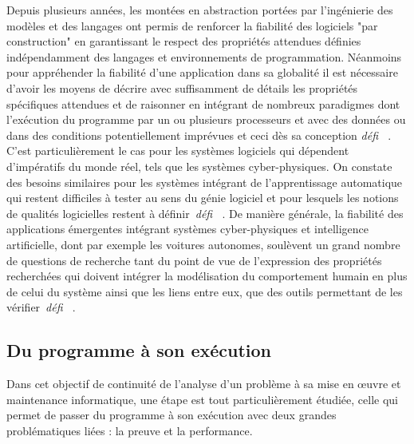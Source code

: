 \documentclass[11pt]{article}
\newcommand{\defi}[1]{\emph{défi~%
\cite{#1}}}
\begin{document}
Depuis plusieurs années, les montées en abstraction portées par l'ingénierie des modèles et des langages ont permis de renforcer la fiabilité des logiciels "par construction" en garantissant le respect des propriétés attendues définies indépendamment des langages et environnements de programmation. 
Néanmoins pour appréhender la fiabilité d'une application dans sa globalité il est nécessaire d'avoir les moyens de décrire avec suffisamment de détails les propriétés spécifiques attendues et de raisonner en intégrant de nombreux paradigmes dont l’exécution du programme par un ou plusieurs processeurs et avec des données ou dans des conditions potentiellement imprévues et ceci dès sa conception \defi{reconfiguration, compilation}. 
%
C'est particulièrement le cas pour les systèmes logiciels qui dépendent d'impératifs du monde réel, tels que les systèmes cyber-physiques. 
On constate des besoins similaires pour les systèmes intégrant de l'apprentissage automatique qui restent difficiles à tester au sens du génie logiciel et pour lesquels les notions de qualités logicielles restent à définir~\defi{IA}.  
De manière générale, la fiabilité des  applications émergentes intégrant  systèmes cyber-physiques et intelligence artificielle, dont par exemple les voitures autonomes, soulèvent  un grand nombre de questions de recherche tant du point de vue de l'expression des propriétés recherchées qui doivent intégrer la modélisation du comportement humain en plus de celui du système ainsi que les liens entre eux, que des outils permettant de les vérifier~\defi{emergents}.


\subsection{Du programme à son exécution\label{ss:fiabilite:execution}}
Dans cet objectif de continuité de l'analyse d'un problème à sa mise en {\oe}uvre et maintenance informatique, une étape est tout particulièrement étudiée, celle qui permet de passer du programme à son exécution avec deux  grandes problématiques liées : la preuve et la performance.
\end{document}
